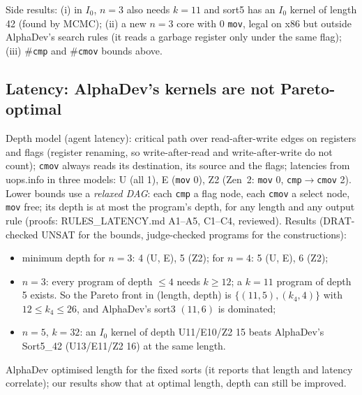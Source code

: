 \documentclass[11pt]{article}
\theoremstyle{remark}\newtheorem{remark}[theorem]{Remark}
\begin{document}
Side results: (i) in $I_0$, $n=3$ also needs $k=11$ and sort5 has an $I_0$ kernel of length 42 (found by MCMC); (ii) a new
$n=3$ core with 0 \texttt{mov}, legal on x86 but outside AlphaDev's search rules (it reads a garbage register only under the same
flag); (iii) \#\texttt{cmp} and \#\texttt{cmov} bounds above.

\subsection{Latency: AlphaDev's kernels are not Pareto-optimal}\label{sec:latency}
Depth model (agent latency): critical path over read-after-write edges on registers and flags (register renaming, so
write-after-read and write-after-write do not count); \texttt{cmov} always reads its destination, its source and the flags;
latencies from uops.info in three models: U (all 1), E (\texttt{mov} 0), Z2 (Zen~2: \texttt{mov} 0, \texttt{cmp}$\to$\texttt{cmov} 2).
Lower bounds use a \emph{relaxed DAG}: each \texttt{cmp} a flag node, each \texttt{cmov} a select node, \texttt{mov} free;
its depth is at most the program's depth, for any length and any output rule (proofs: RULES\_LATENCY.md A1--A5, C1--C4,
reviewed). Results (DRAT-checked UNSAT for the bounds, judge-checked programs for the constructions):
\begin{itemize}
\item minimum depth for $n=3$: 4 (U, E), 5 (Z2); for $n=4$: 5 (U, E), 6 (Z2);
\item $n=3$: every program of depth $\le 4$ needs $k \ge 12$; a $k=11$ program of depth 5 exists. So the Pareto front in
(length, depth) is $\{(11,5), (k_4, 4)\}$ with $12 \le k_4 \le 26$, and AlphaDev's sort3 $(11, 6)$ is dominated;
\item $n=5$, $k=32$: an $I_0$ kernel of depth U11/E10/Z2 15 beats AlphaDev's Sort5\_42 (U13/E11/Z2 16) at the same length.
\end{itemize}
AlphaDev optimised length for the fixed sorts (it reports that length and latency correlate); our results show that at
optimal length, depth can still be improved.


\end{document}
